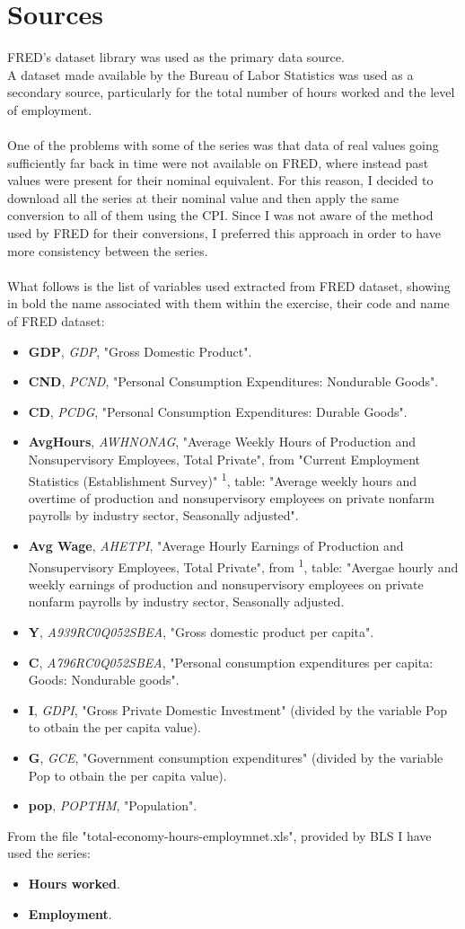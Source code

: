 \documentclass[12pt]{article}
\begin{document}
\newpage

\section*{Sources}
FRED's dataset library was used as the primary data source.\\
A dataset made available by the Bureau of Labor Statistics was used as a secondary source, particularly for the total number of hours worked and the level of employment. \\\\
One of the problems with some of the series was that data of real values going sufficiently far back in time were not available on FRED, where instead past values were present for their nominal equivalent. For this reason, I decided to download all the series at their nominal value and then apply the same conversion to all of them using the CPI. Since I was not aware of the method used by FRED for their conversions, I preferred this approach in order to have more consistency between the series. \\\\
What follows is the list of variables used extracted from FRED dataset, showing in bold the name associated with them within the exercise, their code and name of FRED dataset:
\begin{itemize}
\item \textbf{GDP}, \textit{GDP}, "Gross Domestic Product".
\item \textbf{CND}, \textit{PCND}, "Personal Consumption Expenditures: Nondurable Goods".
\item \textbf{CD}, \textit{PCDG}, "Personal Consumption Expenditures: Durable Goods".
\item \textbf{Avg\textunderscore Hours}, \textit{AWHNONAG}, "Average Weekly Hours of Production and Nonsupervisory Employees, Total Private", from "Current Employment Statistics (Establishment Survey)" \textsuperscript{1}, table: "Average weekly hours and overtime of production and nonsupervisory employees on private nonfarm payrolls by industry sector, Seasonally adjusted". 
\item \textbf{Avg \textunderscore Wage}, \textit{AHETPI}, "Average Hourly Earnings of Production and Nonsupervisory Employees, Total Private", from \textsuperscript{1}, table: "Avergae hourly and weekly earnings of production and nonsupervisory employees on private nonfarm payrolls by industry sector, Seasonally adjusted. 
\item \textbf{Y}, \textit{A939RC0Q052SBEA}, "Gross domestic product per capita".
\item \textbf{C}, \textit{A796RC0Q052SBEA}, "Personal consumption expenditures per capita: Goods: Nondurable goods".
\item \textbf{I}, \textit{GDPI}, "Gross Private Domestic Investment" (divided by the variable Pop to otbain the per capita value).
\item \textbf{G}, \textit{GCE}, "Government consumption expenditures" (divided by the variable Pop to otbain the per capita value).
\item \textbf{pop}, \textit{POPTHM}, "Population".
\end{itemize}
From the file "total-economy-hours-employmnet.xls", provided by BLS I have used the series: 
\begin{itemize}
\item \textbf{Hours worked}.
\item \textbf{Employment}.
\end{itemize}
\end{document}

